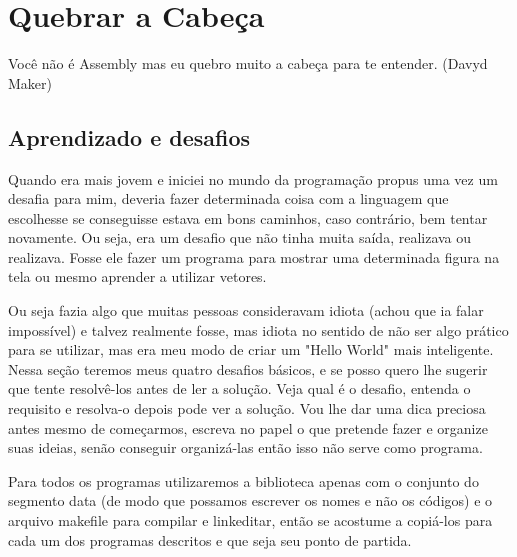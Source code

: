 \chapter{Quebrar a Cabeça}

\begin{remark}
	Você não é Assembly mas eu quebro muito a cabeça para te entender. (Davyd Maker) 
\end{remark}

\section{Aprendizado e desafios}
Quando era mais jovem e iniciei no mundo da programação propus uma vez um desafia para mim, deveria fazer determinada coisa com a linguagem que escolhesse se conseguisse estava em bons caminhos, caso contrário, bem tentar novamente. Ou seja, era um desafio que não tinha muita saída, realizava ou realizava. Fosse ele fazer um programa para mostrar uma determinada figura na tela ou mesmo aprender a utilizar vetores. 

Ou seja fazia algo que muitas pessoas consideravam idiota (achou que ia falar impossível) e talvez realmente fosse, mas idiota no sentido de não ser algo prático para se utilizar, mas era meu modo de criar um "Hello World" mais inteligente. Nessa seção teremos meus quatro desafios básicos, e se posso quero lhe sugerir que tente resolvê-los antes de ler a solução. Veja qual é o desafio, entenda o requisito e resolva-o depois pode ver a solução. Vou lhe dar uma dica preciosa antes mesmo de começarmos, escreva no papel o que pretende fazer e organize suas ideias, senão conseguir organizá-las então isso não serve como programa.

Para todos os programas utilizaremos a biblioteca apenas com o conjunto do segmento data (de modo que possamos escrever os nomes e não os códigos) e o arquivo makefile para compilar e linkeditar, então se acostume a copiá-los para cada um dos programas descritos e que seja seu ponto de partida.

